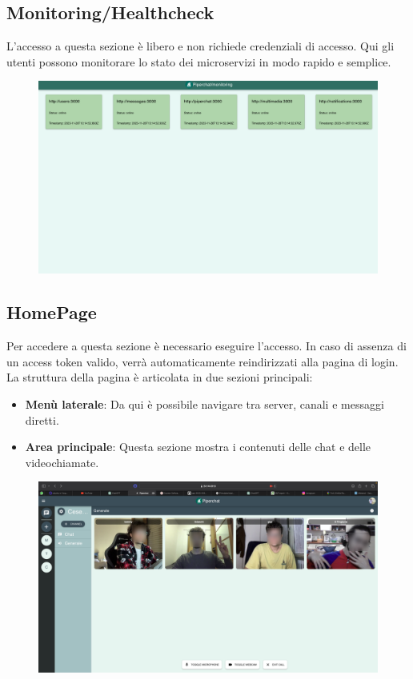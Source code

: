 %
%
%
\subsection{Monitoring/Healthcheck}
L'accesso a questa sezione è libero e non richiede credenziali di accesso. Qui gli utenti possono monitorare lo stato dei microservizi in modo rapido e semplice.

\begin{figure}[htbp]
    \centering
    \includegraphics[width=\textwidth]{sections/07-usage-example/img/monitoring.png}
    \label{fig:moitoring_demo}
\end{figure}

%
%
%
\newpage
\subsection{HomePage}
Per accedere a questa sezione è necessario eseguire l'accesso. In caso di assenza di un access token valido, verrà automaticamente reindirizzati alla pagina di login. La struttura della pagina è articolata in due sezioni principali:
\begin{itemize}
    \item \textbf{Menù laterale}: Da qui è possibile navigare tra server, canali e messaggi diretti.
    \item \textbf{Area principale}: Questa sezione mostra i contenuti delle chat e delle videochiamate.
\end{itemize}

\begin{figure}[htbp]
    \centering
    \includegraphics[width=\textwidth]{sections/07-usage-example/img/demo.png}
    \label{fig:webrtc_demo}
\end{figure}
